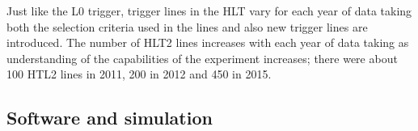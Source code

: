 
Just like the L0 trigger, trigger lines in the HLT vary for each year of data taking both the selection criteria used in the lines and also new trigger lines are introduced. The number of HLT2 lines increases with each year of data taking as understanding of the capabilities of the experiment increases; there were about 100 HTL2 lines in 2011, 200 in 2012 and 450 in 2015. 


\subsection{Software and simulation}
\label{SoftwareSimulation}

